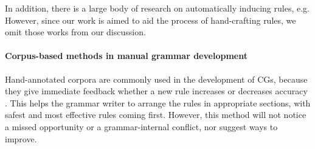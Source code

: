 In addition, there is a large body of research on automatically inducing rules, e.g. \cite{inducing_cg1996,lindberg_eineborg98ilp,lager01transformation,asfrent14} 
However, since our work is aimed to aid the process of hand-crafting rules, we omit those works from our discussion.


\paragraph{Corpus-based methods in manual grammar development}

Hand-annotated corpora are commonly used in the development of CGs, because they give immediate feedback whether a new rule increases or decreases accuracy \cite{voutilainen2004}.
This helps the grammar writer to arrange the rules in appropriate sections, with safest and most effective rules coming first.
However, this method will not notice a missed opportunity or a grammar-internal conflict, nor suggest ways to improve.








